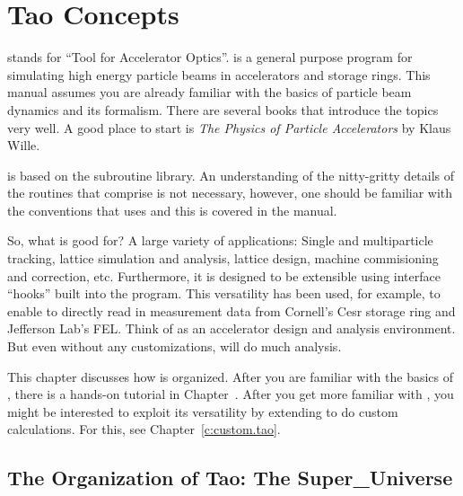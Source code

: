\chapter{Tao Concepts}
\label{c:concepts}

\tao stands for ``Tool for Accelerator Optics''. \tao is a general
purpose program for simulating high energy particle beams in
accelerators and storage rings. This manual assumes you are already
familiar with the basics of particle beam dynamics and its
formalism. There are several books that introduce the topics very
well. A good place to start is \textit{The Physics of Particle
Accelerators} by Klaus Wille\cite{b:wille}.

\tao is based on the \bmad\cite{b:bmad} subroutine library. An
understanding of the nitty-gritty details of the routines that
comprise \bmad is not necessary, however, one should be familiar with
the conventions that \bmad uses and this is covered in the \bmad
manual.

So, what is \tao good for? A large variety of applications: Single and
multiparticle tracking, lattice simulation and analysis, lattice
design, machine commisioning and correction, etc. Furthermore, it is
designed to be extensible using interface ``hooks'' built into the
program.  This versatility has been used, for example, to enable \tao
to directly read in measurement data from Cornell's Cesr storage ring
and Jefferson Lab's FEL. Think of \tao as an accelerator design and
analysis environment. But even without any customizations, \tao will
do much analysis.

This chapter discusses how \tao is organized. After you are familiar
with the basics of \tao, there is a hands-on tutorial in
Chapter~. After you get more familiar with \tao, you
might be interested to exploit its versatility by extending \tao to do
custom calculations. For this, see Chapter~\ref{c:custom.tao}.

\section{The Organization of Tao: The Super\_Universe}
\label{s:organization}

